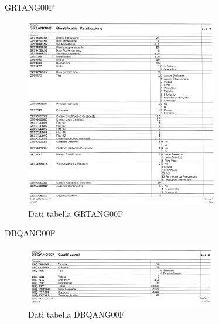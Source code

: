 \documentclass[target=bach,aauheader=,style=]{thud}
\begin{document}
\newpage
GRTANG00F
\begin{figure}[H]
    \begin{center}
        \includegraphics[width=0.75\textwidth]{database/grtang00f.jpg}
    \end{center}
    \caption{Dati tabella GRTANG00F}
\end{figure}

DBQANG00F 
\begin{figure}[H]
    \begin{center}
        \includegraphics[width=0.75\textwidth]{database/dbqang00f.jpg}
    \end{center}
    \caption{Dati tabella DBQANG00F}
\end{figure}


\backmatter

\end{document}
